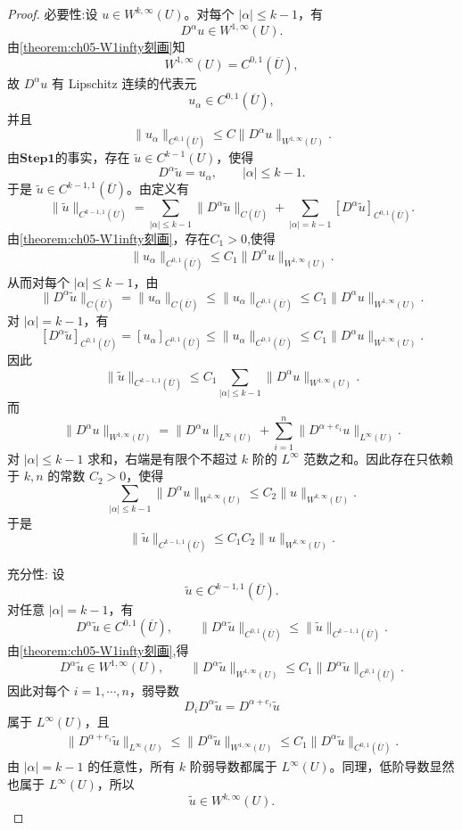 \documentclass[../../main.tex]{subfiles}
\begin{document}
\begin{proof}
{\heiti 必要性:}设 \(u\in W^{k,\infty}(U)\)。对每个 \(|\alpha|\leqslant k-1\)，有
\[
D^\alpha u\in W^{1,\infty}(U).
\]
由\cref{theorem:ch05-W1infty刻画}知
\[
W^{1,\infty}(U)=C^{0,1}(\overline U),
\]
故 \(D^\alpha u\) 有 Lipschitz 连续的代表元
\[
u_\alpha\in C^{0,1}(\overline U),
\]
并且
\[
\|u_\alpha\|_{C^{0,1}(\overline U)}
\leqslant
C\|D^\alpha u\|_{W^{1,\infty}(U)}.
\]
由$\mathbf{Step1}$的事实，存在 \(\widetilde u\in C^{k-1}(U)\)，使得
\[
D^\alpha\widetilde u=u_\alpha,
\qquad
|\alpha|\leqslant k-1.
\]
于是 \(\widetilde u\in C^{k-1,1}(\overline U)\)。由定义有
\[
\|\widetilde u\|_{C^{k-1,1}(\overline U)}
=
\sum_{|\alpha|\leqslant k-1}
\|D^\alpha\widetilde u\|_{C(\overline U)}
+
\sum_{|\alpha|=k-1}
[D^\alpha\widetilde u]_{C^{0,1}(\overline U)}.
\]
由\cref{theorem:ch05-W1infty刻画}，存在$C_1>0$,使得
\begin{align*}
\|u_\alpha\|_{C^{0,1}(\overline U)}
\leqslant
C_1\|D^\alpha u\|_{W^{1,\infty}(U)}.
\end{align*}
从而对每个 \(|\alpha|\leqslant k-1\)，由
\[
\|D^\alpha\widetilde u\|_{C(\overline U)}
=
\|u_\alpha\|_{C(\overline U)}
\leqslant
\|u_\alpha\|_{C^{0,1}(\overline U)}\leqslant
C_1\|D^\alpha u\|_{W^{1,\infty}(U)}.
\]
对 \(|\alpha|=k-1\)，有
\[
[D^\alpha\widetilde u]_{C^{0,1}(\overline U)}
=
[u_\alpha]_{C^{0,1}(\overline U)}
\leqslant
\|u_\alpha\|_{C^{0,1}(\overline U)}\leqslant
C_1\|D^\alpha u\|_{W^{1,\infty}(U)}.
\]
因此
\[
\|\widetilde u\|_{C^{k-1,1}(\overline U)}
\leqslant
C_1
\sum_{|\alpha|\leqslant k-1}
\|D^\alpha u\|_{W^{1,\infty}(U)}.
\]
而
\[
\|D^\alpha u\|_{W^{1,\infty}(U)}
=
\|D^\alpha u\|_{L^\infty(U)}
+
\sum_{i=1}^n
\|D^{\alpha+e_i}u\|_{L^\infty(U)}.
\]
对 \(|\alpha|\leqslant k-1\) 求和，右端是有限个不超过 \(k\) 阶的 \(L^\infty\) 范数之和。因此存在只依赖于 \(k,n\) 的常数 \(C_2>0\)，使得
\[
\sum_{|\alpha|\leqslant k-1}
\|D^\alpha u\|_{W^{1,\infty}(U)}
\leqslant
C_2\|u\|_{W^{k,\infty}(U)}.
\]
于是
\[
\|\widetilde u\|_{C^{k-1,1}(\overline U)}
\leqslant
C_1 C_2
\|u\|_{W^{k,\infty}(U)}.
\]

{\heiti 充分性:}
设
\[
\widetilde u\in C^{k-1,1}(\overline U).
\]
对任意 \(|\alpha|=k-1\)，有
\[
D^\alpha\widetilde u\in C^{0,1}(\overline U),\qquad \|D^\alpha\widetilde u\|_{C^{0,1}(\overline U)}
\leqslant
\|\widetilde u\|_{C^{k-1,1}(\overline U)}.
\]
由\cref{theorem:ch05-W1infty刻画},得
\[
D^\alpha\widetilde u\in W^{1,\infty}(U),\qquad \|D^\alpha\widetilde u\|_{W^{1,\infty}(U)}
\leqslant
C_1
\|D^\alpha\widetilde u\|_{C^{0,1}(\overline U)}.
\]
因此对每个 \(i=1,\cdots,n\)，弱导数
\[
D_iD^\alpha\widetilde u
=
D^{\alpha+e_i}\widetilde u
\]
属于 \(L^\infty(U)\)，且
\begin{align}
\|D^{\alpha+e_i}\widetilde u\|_{L^\infty(U)}
\leqslant
\|D^\alpha\widetilde u\|_{W^{1,\infty}(U)}
\leqslant
C_1
\|D^\alpha\widetilde u\|_{C^{0,1}(\overline U)}.\label{HUFHJOAHJhjqhq}
\end{align}
由 \(|\alpha|=k-1\) 的任意性，所有 \(k\) 阶弱导数都属于 \(L^\infty(U)\)。同理，低阶导数显然也属于 \(L^\infty(U)\)，所以
\[
\widetilde u\in W^{k,\infty}(U).
\]


\end{proof}
\end{document}
